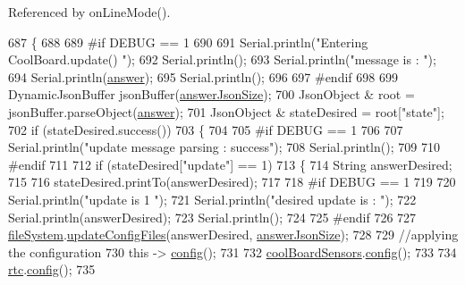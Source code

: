 Referenced by on\+Line\+Mode().


\begin{DoxyCode}
687 \{
688 
689 \textcolor{preprocessor}{#if DEBUG == 1}
690 
691     Serial.println(\textcolor{stringliteral}{"Entering CoolBoard.update() "});
692     Serial.println();
693     Serial.println(\textcolor{stringliteral}{"message is : "});
694     Serial.println(\hyperlink{classCoolBoard_a7b835fafd449e5282f7f91d787a2dc15}{answer});
695     Serial.println();
696 
697 \textcolor{preprocessor}{#endif}
698 
699     DynamicJsonBuffer jsonBuffer(\hyperlink{classCoolBoard_af2da1f85315b3d074a8b87d158094fb7}{answerJsonSize});
700     JsonObject & root = jsonBuffer.parseObject(\hyperlink{classCoolBoard_a7b835fafd449e5282f7f91d787a2dc15}{answer});
701     JsonObject & stateDesired = root[\textcolor{stringliteral}{"state"}];
702     \textcolor{keywordflow}{if} (stateDesired.success())
703     \{
704     
705 \textcolor{preprocessor}{    #if DEBUG == 1}
706 
707         Serial.println(\textcolor{stringliteral}{"update message parsing : success"});
708         Serial.println();
709     
710 \textcolor{preprocessor}{    #endif}
711 
712         \textcolor{keywordflow}{if} (stateDesired[\textcolor{stringliteral}{"update"}] == 1)
713         \{
714             String answerDesired;
715         
716             stateDesired.printTo(answerDesired);
717             
718 \textcolor{preprocessor}{        #if DEBUG == 1      }
719         
720             Serial.println(\textcolor{stringliteral}{"update is 1 "});
721             Serial.println(\textcolor{stringliteral}{"desired update is : "});         
722             Serial.println(answerDesired);
723             Serial.println();
724         
725 \textcolor{preprocessor}{        #endif}
726             
727             \hyperlink{classCoolBoard_a42c2586fbb13ff7f06538e9284e8538d}{fileSystem}.\hyperlink{classCoolFileSystem_a32dad79ae80182a83e2e8f52286b7c7b}{updateConfigFiles}(answerDesired, 
      \hyperlink{classCoolBoard_af2da1f85315b3d074a8b87d158094fb7}{answerJsonSize});
728 
729             \textcolor{comment}{//applying the configuration    }
730             \textcolor{keyword}{this} -> \hyperlink{classCoolBoard_a583a874c09c07e70a6eb9229fc4beddb}{config}();
731 
732             \hyperlink{classCoolBoard_af102be5288bd7f7a8e59b13f86e26a00}{coolBoardSensors}.\hyperlink{classCoolBoardSensors_a9a218895c5423375c33c08f2c56fb23a}{config}();
733 
734             \hyperlink{classCoolBoard_a50d2a6716879d64a85f3c6b44ad63275}{rtc}.\hyperlink{classCoolTime_a87c28260c1bc77091162cbcf1ee2e129}{config}();
735 

\end{DoxyCode}
